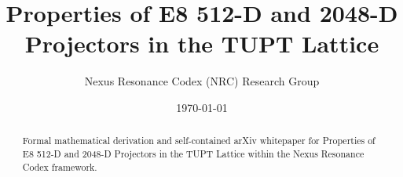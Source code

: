 \documentclass[11pt,a4paper]{article}
\title{Properties of E8 512-D and 2048-D Projectors in the TUPT Lattice}
\author{Nexus Resonance Codex (NRC) Research Group}
\date{\today}
\begin{document}
\maketitle

\begin{abstract}
Formal mathematical derivation and self-contained arXiv whitepaper for Properties of E8 512-D and 2048-D Projectors in the TUPT Lattice within the Nexus Resonance Codex framework.
\end{abstract}





\end{document}
